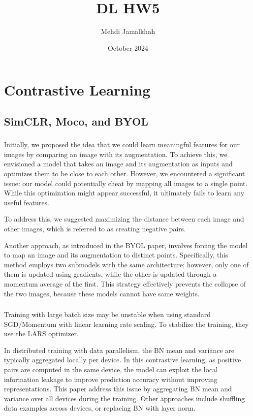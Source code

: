 \documentclass{article}
\title{DL HW5}
\author{Mehdi Jamalkhah}
\date{October 2024}
\begin{document}
\maketitle


\section{Contrastive Learning}
\subsection{SimCLR, Moco, and BYOL}
\subsubsection{}
Initially, we proposed the idea that we could learn meaningful features 
for our images by comparing an image with its augmentation. 
To achieve this, we envisioned a model that takes an image and
its augmentation as inputs and optimizes them to be close to each other.
However, we encountered a significant issue: our model could potentially
cheat by mapping all images to a single point. While this optimization 
might appear successful, it ultimately fails to learn any useful features.

To address this, we suggested maximizing the distance between each image 
and other images, which is referred to as creating negative pairs.

Another approach, as introduced in the BYOL paper, involves forcing 
the model to map an image and its augmentation to distinct points. 
Specifically, this method employs two submodels with the same architecture;
however, only one of them is updated using gradients, while the other is 
updated through a momentum average of the first. This strategy effectively
prevents the collapse of the two images, because these models cannot have same
weights.

\subsubsection{}
Training with large batch size may be unstable when using 
standard SGD/Momentum with linear learning rate scaling. To
stabilize the training, they use the LARS optimizer.

In distributed training with
data parallelism, the BN mean and variance are typically
aggregated locally per device. In this contrastive learning,
as positive pairs are computed in the same device, the model
can exploit the local information leakage to improve prediction
accuracy without improving representations. This paper address 
this issue by aggregating BN mean and variance over
all devices during the training. Other approaches include
shuffling data examples across devices, or
replacing BN with layer norm.
\end{document}
